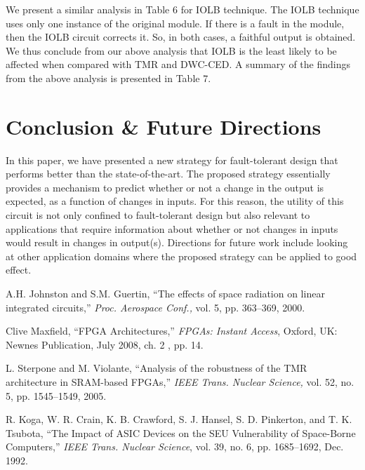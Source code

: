 \documentclass[10pt,journal,cspaper,compsoc]{IEEEtran}
\begin{document}
{{We present a similar analysis in Table 6 for IOLB technique. The IOLB technique uses only one instance of the original module. If there is a fault in the module, then the IOLB circuit corrects it. So, in both cases, a faithful output is obtained. We thus conclude from our above analysis that IOLB is the least likely to be affected when compared with TMR and DWC-CED. A summary of the findings from the above analysis is presented in Table 7.

\section{Conclusion \& Future Directions}\label{sec5}

In this paper, we have presented a new strategy for fault-tolerant design that performs better than the state-of-the-art. The proposed strategy essentially provides a mechanism to predict whether or not a change in the output is expected, as a function of changes in inputs. For this reason, the utility of this circuit is not only confined to fault-tolerant design but also relevant to applications that require information about whether or not changes in inputs would result in changes in output(s). Directions for future work include looking at other application domains where the proposed strategy can be applied to good effect.



\ifCLASSOPTIONcaptionsoff
  \newpage
\fi



\begin{thebibliography}{1}



A.H. Johnston and S.M. Guertin, ``The effects of space radiation on linear integrated circuits,'' \textit{Proc. Aerospace Conf.,} vol. 5, pp. 363--369, 2000.

Clive Maxfield, ``FPGA Architectures,'' \textit{FPGAs: Instant Access}, Oxford, UK: Newnes Publication, July 2008, ch. 2 , pp. 14.


L. Sterpone and M. Violante, ``Analysis of the robustness of the TMR architecture in SRAM-based FPGAs,'' \textit{IEEE Trans. Nuclear Science,} vol. 52, no. 5, pp. 1545--1549, 2005.

R. Koga, W. R. Crain, K. B. Crawford, S. J. Hansel, S. D. Pinkerton, and T. K. Tsubota, ``The Impact of ASIC Devices on the SEU Vulnerability of Space-Borne Computers,''  \textit{IEEE Trans. Nuclear Science}, vol. 39, no. 6, pp. 1685--1692, Dec. 1992.


\end{thebibliography}}}
\end{document}
